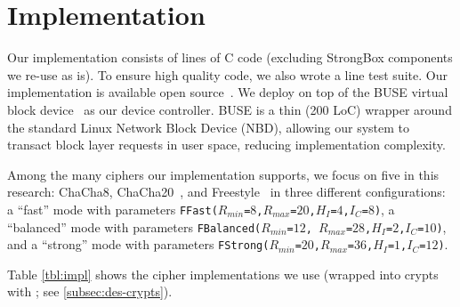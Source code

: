 \section{Implementation}\label{sec:impl}

Our \sys implementation consists of \locTotal lines of C code (excluding
StrongBox components we re-use as is). To ensure high quality code, we also
wrote a \locTest line test suite. Our implementation is available open
source~. We deploy \sys on top of the BUSE virtual block
device~\cite{BUSE} as our device controller. BUSE is a thin (200 LoC)
wrapper around the standard Linux Network Block Device (NBD), allowing our
system to transact block layer requests in user space, reducing implementation
complexity.



Among the many ciphers our implementation supports, we focus on five
in this research: ChaCha8, ChaCha20~\cite{ChaCha20}, and
Freestyle~\cite{Freestyle} in three different configurations: a
``fast'' mode with parameters
\texttt{FFast($R_{min}$=$8$,$R_{max}$=$20$,$H_I$=$4$,$I_C$=$8$)}, a
``balanced'' mode with parameters \texttt{FBalanced($R_{min}$=$12$,
  $R_{max}$=$28$,$H_I$=$2$,$I_C$=$10$)}, and a ``strong'' mode with
parameters
\texttt{FStrong($R_{min}$=$20$,$R_{max}$=$36$,$H_I$=$1$,$I_C$=$12$)}.


Table \cref{tbl:impl} shows the cipher implementations we use (wrapped into
crypts with \sysB; see \cref{subsec:des-crypts}).

